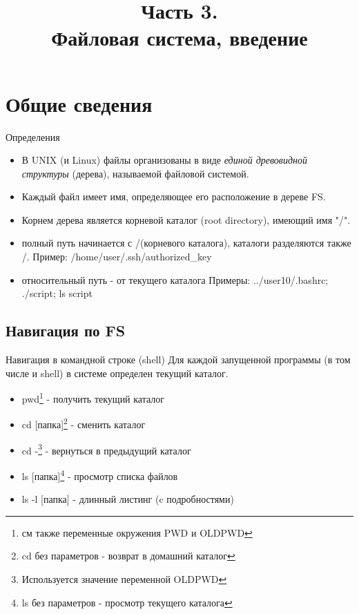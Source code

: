 


\title[SaM Solutions. Linux QA Training]
{
  Часть 3.\\
  Файловая система, введение
}



\firstframe

\section{Общие сведения}
\begin{frame}{Определения}
  \begin{itemize}
    \item В UNIX (и Linux) файлы организованы в виде \emph{единой древовидной структуры} (дерева), называемой \alert{файловой системой}.
    \item \alert{Каждый файл имеет имя}, определяющее его расположение в дереве FS.
    \item Корнем дерева является \alert{корневой каталог} (root directory), имеющий имя \alert{"/"}.
  \end{itemize} \pause

  \begin{itemize}
    \item \alert{полный путь} начинается с \alert{/}(корневого каталога), каталоги разделяются также \alert{/}. \newline
      Пример: /home/user/.ssh/authorized\_key
    \item \alert{относительный путь} - от текущего каталога \newline
      Примеры: ../user10/.bashrc; ./script; ls script
  \end{itemize}

\end{frame}

\subsection{Навигация по FS}
\begin{frame}{Навигация в командной строке (shell)}
  Для каждой запущенной программы (в том числе и shell) в системе определен \alert{текущий каталог}. 
  \begin{itemize} 
    \item \alert{pwd}\footnote{см также переменные окружения \alert{PWD} и \alert{OLDPWD}} - получить текущий каталог
    \item \alert{cd [папка]}\footnote{\alert{cd} без параметров - возврат в домашний каталог} - сменить каталог
    \item \alert{cd -}\footnote{Используется значение переменной \alert{OLDPWD}} - вернуться в предыдущий каталог
    \item \alert{ls [папка]}\footnote{\alert{ls} без параметров - просмотр текущего каталога} - просмотр списка файлов
    \item \alert{ls -l [папка]} - длинный листинг (c подробностями)
  \end{itemize}
\end{frame}

